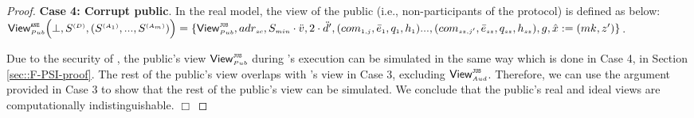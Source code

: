 \begin{proof}
 
 

\noindent\textbf{Case 4: Corrupt public}. In the real model, the view of the public (i.e., non-participants of the protocol) is defined as below: 
 $ \mathsf{View}_{\scriptscriptstyle Pub}^{\scriptscriptstyle \mathtt{ANE}} \Big(\bot, S^{\scriptscriptstyle (D)},(S^{\scriptscriptstyle (A_1)},...,\\ S^{\scriptscriptstyle (A_m)})\Big)= 
\{\mathsf{View}^{\scriptscriptstyle \mathtt{JUS}}_{\scriptscriptstyle Pub}, adr_{\scriptscriptstyle sc}, S_{\scriptscriptstyle min}\cdot \ddot{v}, 2\cdot \ddot{d}', (com_{\scriptscriptstyle 1,j}, \bar{e}_{\scriptscriptstyle 1}, q_{\scriptscriptstyle 1}, h_{\scriptscriptstyle 1})..., (com_{\scriptscriptstyle sz, j'}, \bar{e}_{\scriptscriptstyle sz}, q_{\scriptscriptstyle {sz}},\\ h_{\scriptscriptstyle sz}), g, \hat{x}:=({mk}, z')\}$.
 
 
 
  Due to the security of \fpsi, the public's view $\mathsf{View}^{\scriptscriptstyle \mathtt{JUS}}_{\scriptscriptstyle Pub}$ during \fpsi's execution can be simulated in the same way which is done in Case 4, in Section \ref{sec::F-PSI-proof}. The rest of the public's view overlaps with \aud's view in Case 3, excluding $\mathsf{View}^{\scriptscriptstyle \mathtt{JUS}}_{\scriptscriptstyle Aud}$. Therefore, we can use the argument provided in Case 3 to show that the rest of the public's view can be simulated.     
   We  conclude that the public's real and ideal views are computationally indistinguishable. 
  \hfill\(\Box\)\end{proof}
















